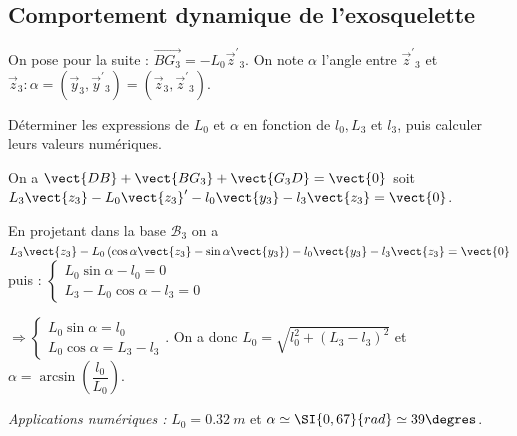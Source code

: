 \subsection{Comportement dynamique de l'exosquelette}
On pose pour la suite : $\overrightarrow{B G_{3}}=-L_{0} \vec{z}^{\prime}{ }_{3}$. On note $\alpha$ l'angle entre $\vec{z}^{\prime}{ }_{3}$ et $\vec{z}_{3}: \alpha=\left(\vec{y}_{3}, \vec{y}^{\prime}{ }_{3}\right)=\left(\vec{z}_{3}, \vec{z}^{\prime}{ }_{3}\right)$.\\

\begin{question}
\label{2023_ccs_psi_q_06}
Déterminer les expressions de $L_{0}$ et $\alpha$ en fonction de $l_{0}, L_{3}$ et $l_{3}$, puis calculer leurs valeurs numériques.
\end{question}
\ifprof
\begin{corrige}
On a $\vect{DB}+\vect{BG_3}+\vect{G_3D} = \vect{0}$ soit $L_3\vect{z_3}-L_0\vect{z_3}'-l_0\vect{y_3}-l_3\vect{z_3} = \vect{0}$. 

En projetant dans la base $\mathcal{B}_3$ on a 
$L_3\vect{z_3}-L_0\left(\cos\alpha \vect{z_3} - \sin\alpha \vect{y_3} \right)-l_0\vect{y_3}-l_3\vect{z_3} = \vect{0}$ puis : 
$
\left\{ \begin{array}{l}
L_0 \sin\alpha -l_0 = 0 \\
L_3-L_0 \cos\alpha -l_3 = 0
\end{array}
\right.
$

$
\Rightarrow 
\left\{ \begin{array}{l}
L_0 \sin\alpha = l_0  \\
L_0 \cos\alpha  = L_3 - l_3 
\end{array}
\right.
$.
On a donc $L_0 =\sqrt{l_0 ^2 + \left(L_3- l_3\right)^2}$ et $\alpha = \arcsin \left(\dfrac{l_0}{L_0}\right)$.

\textit{Applications numériques : } $L_0= \SI{0,32}{m}$ et $\alpha \simeq \SI{0,67}{rad} \simeq 39\degres$.

\end{corrige}
\else
\fi


